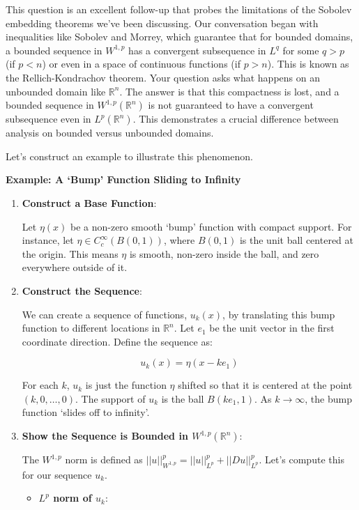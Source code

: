 \documentclass[12pt,a4paper]{report}
\begin{document}
\begin{enumerate}
	This question is an excellent follow-up that probes the limitations of the Sobolev embedding theorems we've been discussing. Our conversation began with inequalities like Sobolev and Morrey, which guarantee that for bounded domains, a bounded sequence in $W^{1,p}$ has a convergent subsequence in $L^q$ for some $q > p$ (if $p < n$) or even in a space of continuous functions (if $p > n$). This is known as the Rellich-Kondrachov theorem. Your question asks what happens on an unbounded domain like $\mathbb{R}^n$. The answer is that this compactness is lost, and a bounded sequence in $W^{1,p}(\mathbb{R}^n)$ is not guaranteed to have a convergent subsequence even in $L^p(\mathbb{R}^n)$. This demonstrates a crucial difference between analysis on bounded versus unbounded domains.

Let's construct an example to illustrate this phenomenon.

\textbf{Example: A `Bump' Function Sliding to Infinity}

\begin{enumerate}
\item \textbf{Construct a Base Function}: 

Let $\eta(x)$ be a non-zero smooth `bump' function with compact support. For instance, let $\eta \in C_c^\infty(B(0,1))$, where $B(0,1)$ is the unit ball centered at the origin. This means $\eta$ is smooth, non-zero inside the ball, and zero everywhere outside of it.

\item \textbf{Construct the Sequence}: 

We can create a sequence of functions, $u_k(x)$, by translating this bump function to different locations in $\mathbb{R}^n$. Let $e_1$ be the unit vector in the first coordinate direction. Define the sequence as:

    $$ u_k(x) = \eta(x - k e_1) $$

    For each $k$, $u_k$ is just the function $\eta$ shifted so that it is centered at the point $(k, 0, \dots, 0)$. The support of $u_k$ is the ball $B(k e_1, 1)$. As $k \to \infty$, the bump function `slides off to infinity'.

\item \textbf{Show the Sequence is Bounded in $W^{1,p}(\mathbb{R}^n)$}:

    The $W^{1,p}$ norm is defined as $||u||_{W^{1,p}}^p = ||u||_{L^p}^p + ||Du||_{L^p}^p$. Let's compute this for our sequence $u_k$.

\begin{itemize}
    \item \textbf{$L^p$ norm of $u_k$}: 
    

\end{itemize}
\end{enumerate}
\end{enumerate}
\end{document}

